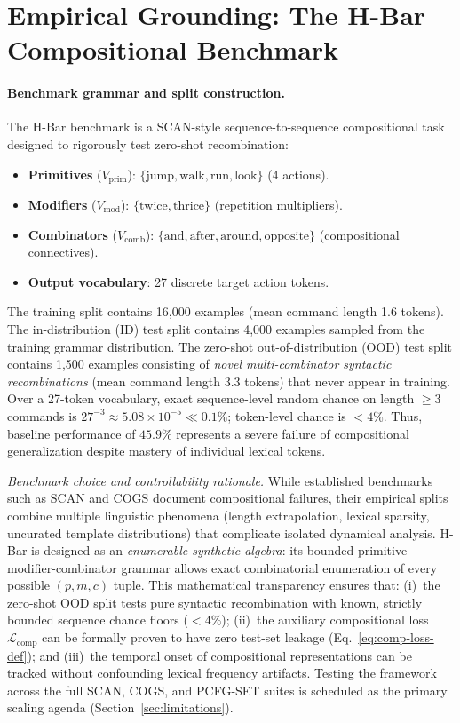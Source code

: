 \documentclass{article}
\theoremstyle{definition}
\begin{document}
\section{Empirical Grounding: The H-Bar Compositional Benchmark}\label{sec:empirical}

\paragraph*{Benchmark grammar and split construction.}
The H-Bar benchmark is a SCAN-style sequence-to-sequence compositional task designed to rigorously test zero-shot recombination:
\begin{itemize}[nosep]
\item \textbf{Primitives} ($V_{\text{prim}}$): $\{\text{jump}, \text{walk}, \text{run}, \text{look}\}$ (4 actions).
\item \textbf{Modifiers} ($V_{\text{mod}}$): $\{\text{twice}, \text{thrice}\}$ (repetition multipliers).
\item \textbf{Combinators} ($V_{\text{comb}}$): $\{\text{and}, \text{after}, \text{around}, \text{opposite}\}$ (compositional connectives).
\item \textbf{Output vocabulary}: 27 discrete target action tokens.
\end{itemize}
The training split contains 16{,}000 examples (mean command length 1.6 tokens). The in-distribution (ID) test split contains 4{,}000 examples sampled from the training grammar distribution. The zero-shot out-of-distribution (OOD) test split contains 1{,}500 examples consisting of \emph{novel multi-combinator syntactic recombinations} (mean command length 3.3 tokens) that never appear in training. Over a 27-token vocabulary, exact sequence-level random chance on length $\ge 3$ commands is $27^{-3} \approx 5.08 \times 10^{-5} \ll 0.1\%$; token-level chance is $< 4\%$. Thus, baseline performance of $45.9\%$ represents a severe failure of compositional generalization despite mastery of individual lexical tokens.

\noindent\textit{Benchmark choice and controllability rationale.} While established benchmarks such as SCAN \citep{lake2018generalizationwithoutsystematicity} and COGS \citep{kim2020cogscompositionalgeneralizationchallenge} document compositional failures, their empirical splits combine multiple linguistic phenomena (length extrapolation, lexical sparsity, uncurated template distributions) that complicate isolated dynamical analysis. H-Bar is designed as an \emph{enumerable synthetic algebra}: its bounded primitive-modifier-combinator grammar allows exact combinatorial enumeration of every possible $(p, m, c)$ tuple. This mathematical transparency ensures that: (i)~the zero-shot OOD split tests pure syntactic recombination with known, strictly bounded sequence chance floors ($< 4\%$); (ii)~the auxiliary compositional loss $\mathcal{L}_{\text{comp}}$ can be formally proven to have zero test-set leakage (Eq.~\eqref{eq:comp-loss-def}); and (iii)~the temporal onset of compositional representations can be tracked without confounding lexical frequency artifacts. Testing the framework across the full SCAN, COGS, and PCFG-SET suites is scheduled as the primary scaling agenda (Section~\ref{sec:limitations}).
\end{document}
